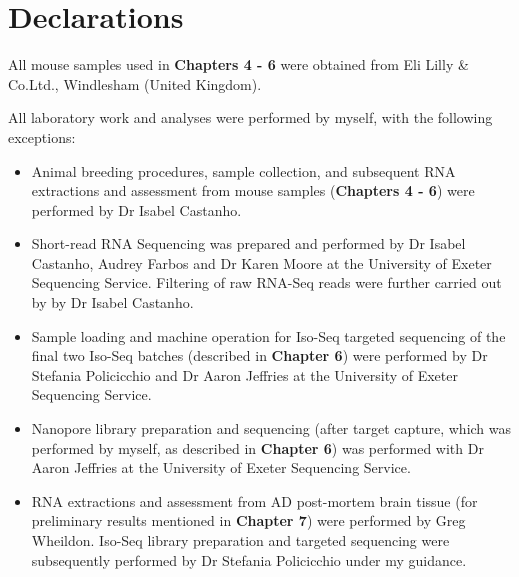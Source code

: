 \chapter*{Declarations}

All mouse samples used in \textbf{Chapters 4 - 6}  were obtained from Eli Lilly \& Co.Ltd., Windlesham (United Kingdom). 

All laboratory work and analyses were performed by myself, with the following exceptions:
\begin{itemize}
	\item Animal breeding procedures, sample collection, and subsequent RNA extractions and assessment from mouse samples (\textbf{Chapters 4 - 6}) were performed by Dr Isabel Castanho.
	\item Short-read RNA Sequencing was prepared and performed by Dr Isabel Castanho, Audrey Farbos and Dr Karen Moore at the University of Exeter Sequencing Service. Filtering of raw RNA-Seq reads were further carried out by by Dr Isabel Castanho.
	\item Sample loading and machine operation for Iso-Seq targeted sequencing of the final two Iso-Seq batches (described in \textbf{Chapter 6}) were performed by Dr Stefania Policicchio and Dr Aaron Jeffries at the University of Exeter Sequencing Service.  
	\item Nanopore library preparation and sequencing (after target capture, which was performed by myself, as described in \textbf{Chapter 6}) was performed with Dr Aaron Jeffries at the University of Exeter Sequencing Service. 	
	\item RNA extractions and assessment from AD post-mortem brain tissue (for preliminary results mentioned in \textbf{Chapter 7}) were performed by Greg Wheildon. Iso-Seq library preparation and targeted sequencing were subsequently performed by Dr Stefania Policicchio under my guidance.
\end{itemize}